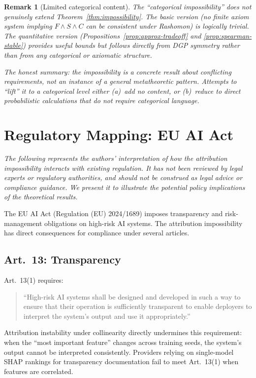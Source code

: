\documentclass{article}
\newtheorem{remark}[theorem]{Remark}
\begin{document}
\begin{remark}[Limited categorical content]
\label{rem:categorical-limited}
The ``categorical impossibility'' does not genuinely extend
Theorem~\ref{thm:impossibility}. The basic version (no finite axiom system implying
$F \wedge S \wedge C$ can be consistent under Rashomon) is
logically trivial. The quantitative version
(Propositions~\ref{prop:approx-tradeoff} and
\ref{prop:spearman-stable}) provides useful bounds but
follows directly from DGP symmetry rather than from
any categorical or axiomatic structure.

The honest summary: the impossibility is a \emph{concrete}
result about conflicting requirements, not an instance of a
general metatheoretic pattern. Attempts to ``lift'' it to a
categorical level either (a)~add no content, or (b)~reduce to
direct probabilistic calculations that do not require categorical
language.
\end{remark}

\section{Regulatory Mapping: EU AI Act}
\label{sec:regulatory-mapping}

\emph{The following represents the authors' interpretation of how the attribution impossibility interacts with existing regulation. It has not been reviewed by legal experts or regulatory authorities, and should not be construed as legal advice or compliance guidance. We present it to illustrate the \emph{potential} policy implications of the theoretical results.}

The EU AI Act (Regulation (EU) 2024/1689) imposes transparency and risk-management obligations on high-risk AI systems. The attribution impossibility has direct consequences for compliance under several articles.

\subsection*{Art.~13: Transparency}

Art.~13(1) requires:
\begin{quote}
``High-risk AI systems shall be designed and developed in such a way to ensure that their operation is sufficiently transparent to enable deployers to interpret the system's output and use it appropriately.''
\end{quote}
Attribution instability under collinearity directly undermines this requirement: when the ``most important feature'' changes across training seeds, the system's output cannot be interpreted consistently. Providers relying on single-model SHAP rankings for transparency documentation fail to meet Art.~13(1) when features are correlated.
\end{document}
